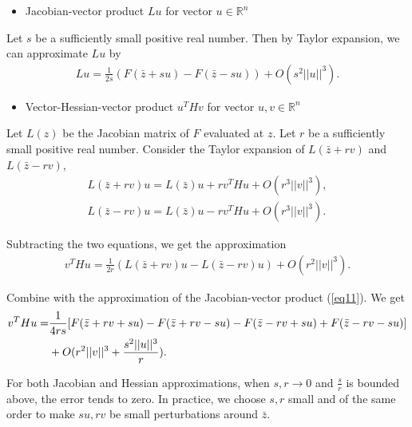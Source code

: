 \documentclass[article,ij4uq]{ij4uq}              %
\begin{document}
\begin{itemize}
    \item Jacobian-vector product $Lu$ for vector $u\in\mathbb{R}^{n}$
\end{itemize}
\par Let $s$ be a sufficiently small positive real number. Then by Taylor expansion, we can approximate $Lu$ by
\begin{align}
    Lu=\frac{1}{2s}(F(\bar{z}+su)-F(\bar{z}-su))+O(s^{2}||u||^{3}).\label{eq11}
\end{align}
\begin{itemize}
    \item Vector-Hessian-vector product $u^{T}Hv$ for vector $u,v\in\mathbb{R}^{n}$
\end{itemize}
\par Let $L(z)$ be the Jacobian matrix of $F$ evaluated at $z$. Let $r$ be a sufficiently small positive real number. Consider the Taylor expansion of $L(\bar{z}+rv)$ and $L(\bar{z}-rv)$,
\begin{align}
    L(\bar{z}+rv)u=L(\bar{z})u+rv^{T}Hu+O(r^{3}||v||^{3}),\label{eq12}\\
    L(\bar{z}-rv)u=L(\bar{z})u-rv^{T}Hu+O(r^{3}||v||^{3}).\label{eq13}
\end{align}
\par Subtracting the two equations, we get the approximation
\begin{align}
    v^{T}Hu=\frac{1}{2r}(L(\bar{z}+rv)u-L(\bar{z}-rv)u)+O(r^{2}||v||^{3}).\label{eq14}
\end{align}
\par Combine with the approximation of the Jacobian-vector product (\ref{eq11}). We get
\begin{align}
    v^{T}Hu=&\frac{1}{4rs}[F(\bar{z}+rv+su)-F(\bar{z}+rv-su)
    -F(\bar{z}-rv+su)+F(\bar{z}-rv-su)]\notag\\
    &+O(r^{2}||v||^{3}+\frac{s^{2}||u||^{3}}{r}).\label{eq15}
\end{align}
\par For both Jacobian and Hessian approximations, when $s,r\rightarrow 0$ and $\frac{s}{r}$ is bounded above, the error tends to zero. In practice, we choose $s,r$ small and of the same order to make $su,rv$ be small perturbations around $\bar{z}$.
\end{document}
